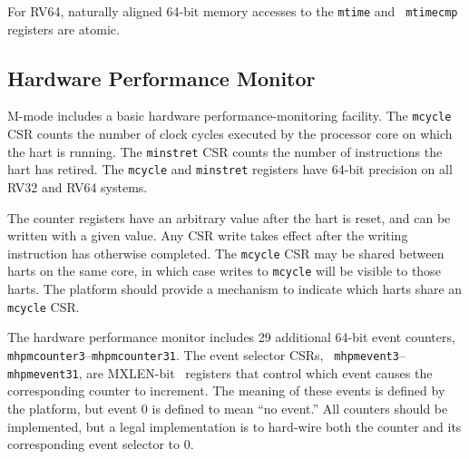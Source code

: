 For RV64, naturally aligned 64-bit memory accesses to the {\tt mtime} and {\tt
mtimecmp} registers are atomic.

\subsection{Hardware Performance Monitor}

M-mode includes a basic hardware performance-monitoring facility.  The
{\tt mcycle} CSR counts the number of clock cycles executed by the
processor core on which the hart is running.
The {\tt minstret} CSR counts the number of instructions the hart has
retired.  The {\tt mcycle} and {\tt minstret} registers have 64-bit
precision on all RV32 and RV64 systems.

The counter registers have an arbitrary value after the hart is reset, and
can be written with a given value. Any CSR write takes effect after
the writing instruction has otherwise completed.
The {\tt mcycle} CSR may be shared between harts on the same core, in which
case writes to {\tt mcycle} will be visible to those harts.
The platform should provide a mechanism to indicate which harts share an {\tt
mcycle} CSR.

The hardware performance monitor includes 29 additional 64-bit event counters, {\tt
mhpmcounter3}--{\tt mhpmcounter31}.  The event selector CSRs, {\tt
mhpmevent3}--{\tt mhpmevent31}, are MXLEN-bit \warl\ registers that control which event
causes the corresponding counter to increment.  The meaning of these events is
defined by the platform, but event 0 is defined to mean ``no event.''
All counters should be implemented, but a legal implementation is to hard-wire
both the counter and its corresponding event selector to 0.

